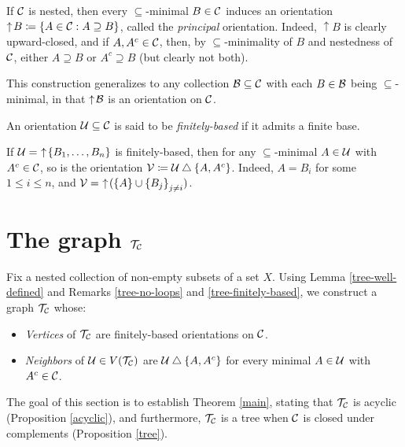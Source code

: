\documentclass{amsart}
\begin{document}
    \begin{remark}
        If $\mathcal{C}$ is nested, then every $\subseteq$-minimal $B\in\mathcal{C}$ induces an orientation $\uparrow\!B\coloneqq\left\{A\in\mathcal{C}: A\supseteq B\right\}$, called the \textit{principal} orientation. Indeed, $\uparrow\!B$ is clearly upward-closed, and if $A,A^c\in\mathcal{C}$, then, by $\subseteq$-minimality of $B$ and nestedness of $\mathcal{C}$, either $A\supseteq B$ or $A^c\supseteq B$ (but clearly not both).

        This construction generalizes to any collection $\mathcal{B}\subseteq\mathcal{C}$ with each $B\in\mathcal{B}$ being $\subseteq$-minimal, in that $\uparrow\!\mathcal{B}$ is an orientation on $\mathcal{C}$.
    \end{remark}

    \begin{definition}
        An orientation $\mathcal{U}\subseteq\mathcal{C}$ is said to be \textit{finitely-based} if it admits a finite base.
    \end{definition}

    \begin{remark}\label{tree-finitely-based}
        If $\mathcal{U}=\,\,\uparrow\!\left\{B_1,\dots,B_n\right\}$ is finitely-based, then for any $\subseteq$-minimal $A\in\mathcal{U}$ with $A^c\in\mathcal{C}$, so is the orientation $\mathcal{V}\coloneqq\mathcal{U}\bigtriangleup\left\{A,A^c\right\}$. Indeed, $A=B_i$ for some $1\leq i\leq n$, and $\mathcal{V}=\,\,\uparrow\!(\left\{A\right\}\cup\left\{B_j\right\}_{j\neq i})$.
    \end{remark}

    \section{The graph $\mathcal{T}_{\mathcal{C}}$}

    Fix a nested collection of non-empty subsets of a set $X$. Using Lemma \ref{tree-well-defined} and Remarks \ref{tree-no-loops} and \ref{tree-finitely-based}, we construct a graph $\mathcal{T}_{\mathcal{C}}$ whose:
    \begin{itemize}
        \item \textit{Vertices} of $\mathcal{T}_{\mathcal{C}}$ are finitely-based orientations on $\mathcal{C}$.
        \item \textit{Neighbors} of $\mathcal{U}\in V(\mathcal{T}_{\mathcal{C}})$ are $\mathcal{U}\bigtriangleup\left\{A,A^c\right\}$ for every minimal $A\in\mathcal{U}$ with $A^c\in\mathcal{C}$.
    \end{itemize}

    The goal of this section is to establish Theorem \ref{main}, stating that $\mathcal{T}_{\mathcal{C}}$ is acyclic (Proposition \ref{acyclic}), and furthermore, $\mathcal{T}_{\mathcal{C}}$ is a tree when $\mathcal{C}$ is closed under complements (Proposition \ref{tree}).
\end{document}
